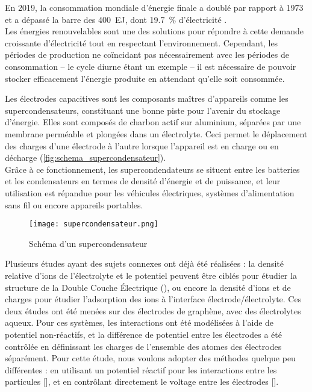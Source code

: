 En 2019, la consommation mondiale d'énergie finale a doublé par rapport à 1973 et a dépassé la barre des \qty{400}{\exa \joule}, dont \qty{19.7}{\percent} d'électricité \cite{birol_key_nodate}.\\
Les énergies renouvelables sont une des solutions pour répondre à cette demande croissante d'électricité tout en respectant l'environnement. Cependant, les périodes de production ne coïncidant pas nécessairement avec les périodes de consommation -- le cycle diurne étant un exemple -- il est nécessaire de pouvoir stocker efficacement l'énergie produite en attendant qu'elle soit consommée.

Les électrodes capacitives sont les composants maîtres d'appareils comme les supercondensateurs, constituant une bonne piste pour l'avenir du stockage d'énergie. Elles sont composés de charbon actif sur aluminium, séparées par une membrane perméable et plongées dans un électrolyte. Ceci permet le déplacement des charges d'une électrode à l'autre lorsque l'appareil est en charge ou en décharge (\autoref{fig:schema_supercondensateur}).\\
Grâce à ce fonctionnement, les supercondendateurs se situent entre les batteries et les condensateurs en termes de densité d'énergie et de puissance, et leur utilisation est répandue pour les véhicules électriques, systèmes d'alimentation sans fil ou encore appareils portables.

\begin{figure}[h!]
    \centering
    \texttt{[image: supercondensateur.png]}
    \caption{Schéma d'un supercondensateur}
    \label{fig:schema_supercondensateur}
\end{figure}

Plusieurs études ayant des sujets connexes ont déjà été réalisées : la densité relative d'ions de l'électrolyte et le potentiel peuvent être ciblés pour étudier la structure de la Double Couche Électrique (\edl{})\cite{jiang_molecular_2016}, ou encore la densité d'ions et de charges pour étudier l'adsorption des ions à l'interface électrode/électrolyte\cite{cole_ion_2011}.
Ces deux études ont été menées sur des électrodes de graphène, avec des électrolytes aqueux. Pour ces systèmes, les interactions ont été modélisées à l'aide de potentiel non-réactifs, et la différence de potentiel entre les électrodes a été contrôlée en définissant les charges de l'ensemble des atomes des électrodes séparément.
Pour cette étude, nous voulons adopter des méthodes quelque peu différentes : en utilisant un potentiel réactif pour les interactions entre les particules [\reaxff{}], et en contrôlant directement le voltage entre les électrodes [\echemdid{}].

